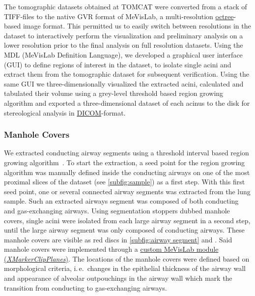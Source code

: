 \documentclass[twoside,paper=a4,abstract=true,english,DIV=calc]{scrartcl}
\newcommand{\ie}{i.\,e.\ }
\begin{document}
The tomographic datasets obtained at TOMCAT were converted from a stack of TIFF-files to the native GVR format of MeVisLab, a multi-resolution \href{https://secure.wikimedia.org/wikipedia/en/w/index.php?title=Octree&oldid=409131920}{octree}-based image format. This permitted us to easily switch between resolutions in the dataset to interactively perform the visualization and preliminary analysis on a lower resolution prior to the final analysis on full resolution datasets. Using the MDL (MeVisLab Definition Language), we developed a graphical user interface (GUI) to define regions of interest in the dataset, to isolate single acini and extract them from the tomographic dataset for subsequent verification. Using the same GUI we three-dimensionally visualized the extracted acini, calculated and tabulated their volume using a grey-level threshold based region growing algorithm and exported a three-dimensional dataset of each acinus to the disk for stereological analysis in \href{http://en.wikipedia.org/w/index.php?title=DICOM&oldid=511155074}{DICOM}-format.

\subsubsection{Manhole Covers}
We extracted conducting airway segments using a threshold interval based region growing algorithm~\cite{Zucker1976}. To start the extraction, a seed point for the region growing algorithm was manually defined inside the conducting airways on one of the most proximal slices of the dataset (see \autoref{subfig:sample}) as a first step. With this first seed point, one or several connected airway segments was extracted from the lung sample. Such an extracted airways segment was composed of both conducting and gas-exchanging airways. Using segmentation stoppers dubbed manhole covers, single acini were isolated from each large airway segment in a second step, until the large airway segment was only composed of conducting airways. These manhole covers are visible as red discs in \autoref{subfig:airway segment} and . Said manhole covers were implemented through a \href{http://www.mevis-research.de/cgi-bin/discus/board-auth.cgi?lm=1282233250&file=/839/11760.html}{custom MeVisLab module (\emph{XMarkerClipPlanes})}. The locations of the manhole covers were defined based on morphological criteria, \ie changes in the epithelial thickness of the airway wall and appearance of alveolar outpouchings in the airway wall which mark the transition from conducting to gas-exchanging airways.
\end{document}

